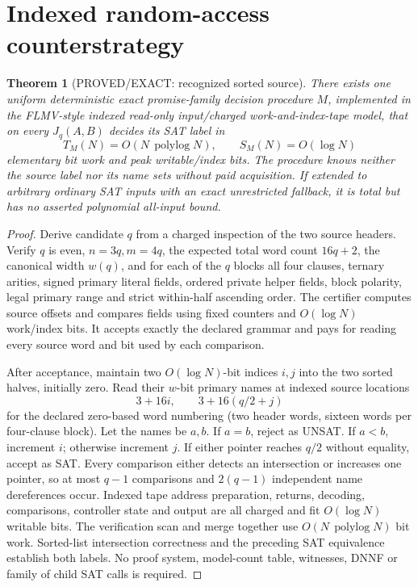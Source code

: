 \documentclass[11pt]{article}
\newtheorem{theorem}{Theorem}
\begin{document}
\section{Indexed random-access counterstrategy}
\begin{theorem}[PROVED/EXACT: recognized sorted source]
There exists one uniform deterministic exact \emph{promise-family} decision procedure \(M\), implemented in the FLMV-style indexed read-only input/charged work-and-index-tape model, that on \emph{every} \(J_q(A,B)\) decides its SAT label in
\[
 T_M(N)=O(N\,\operatorname{polylog}N),\qquad S_M(N)=O(\log N)
\]
elementary bit work and peak writable/index bits. The procedure knows neither the source label nor its name sets without paid acquisition. If extended to arbitrary ordinary SAT inputs with an exact unrestricted fallback, it is total but has no asserted polynomial all-input bound.
\end{theorem}
\begin{proof}
Derive candidate \(q\) from a charged inspection of the two source headers. Verify \(q\) is even, \(n=3q,m=4q\), the expected total word count \(16q+2\), the canonical width \(w(q)\), and for each of the \(q\) blocks all four clauses, ternary arities, signed primary literal fields, ordered private helper fields, block polarity, legal primary range and strict within-half ascending order. The certifier computes source offsets and compares fields using fixed counters and \(O(\log N)\) work/index bits. It accepts exactly the declared grammar and pays for reading every source word and bit used by each comparison.

After acceptance, maintain two \(O(\log N)\)-bit indices \(i,j\) into the two sorted halves, initially zero. Read their \(w\)-bit primary names at indexed source locations
\[
 3+16i,\qquad 3+16(q/2+j)
\]
for the declared zero-based word numbering (two header words, sixteen words per four-clause block). Let the names be \(a,b\). If \(a=b\), reject as UNSAT. If \(a<b\), increment \(i\); otherwise increment \(j\). If either pointer reaches \(q/2\) without equality, accept as SAT. Every comparison either detects an intersection or increases one pointer, so at most \(q-1\) comparisons and \(2(q-1)\) independent name dereferences occur. Indexed tape address preparation, returns, decoding, comparisons, controller state and output are all charged and fit \(O(\log N)\) writable bits. The verification scan and merge together use \(O(N\,\operatorname{polylog}N)\) bit work. Sorted-list intersection correctness and the preceding SAT equivalence establish both labels. No proof system, model-count table, witnesses, DNNF or family of child SAT calls is required.
\end{proof}
\end{document}
